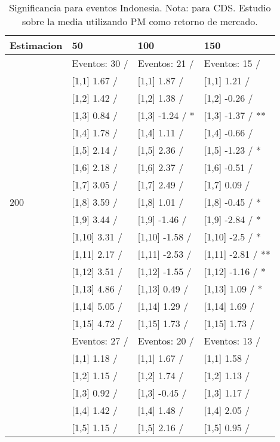 \begin{table}

\caption{Significancia para eventos Indonesia. Nota: para CDS. Estudio sobre la media utilizando PM como retorno de mercado.}
\centering
\begin{tabular}[t]{llll}
\toprule
Estimacion & 50 & 100 & 150\\
\midrule
 & Eventos:  30 / & Eventos:  21 / & Eventos:  15 /\\
 & {}[1,1] 1.67  / & {}[1,1] 1.87  / & {}[1,1] 1.21  /\\
 & {}[1,2] 1.42  / & {}[1,2] 1.38  / & {}[1,2] -0.26  /\\
 & {}[1,3] 0.84  / & {}[1,3] -1.24  / * & {}[1,3] -1.37  / **\\
 & {}[1,4] 1.78  / & {}[1,4] 1.11  / & {}[1,4] -0.66  /\\
\addlinespace
 & {}[1,5] 2.14  / & {}[1,5] 2.36  / & {}[1,5] -1.23  / *\\
 & {}[1,6] 2.18  / & {}[1,6] 2.37  / & {}[1,6] -0.51  /\\
 & {}[1,7] 3.05  / & {}[1,7] 2.49  / & {}[1,7] 0.09  /\\
200 & {}[1,8] 3.59  / & {}[1,8] 1.01  / & {}[1,8] -0.45  / *\\
 & {}[1,9] 3.44  / & {}[1,9] -1.46  / & {}[1,9] -2.84  / *\\
\addlinespace
 & {}[1,10] 3.31  / & {}[1,10] -1.58  / & {}[1,10] -2.5  / *\\
 & {}[1,11] 2.17  / & {}[1,11] -2.53  / & {}[1,11] -2.81  / **\\
 & {}[1,12] 3.51  / & {}[1,12] -1.55  / & {}[1,12] -1.16  / *\\
 & {}[1,13] 4.86  / & {}[1,13] 0.49  / & {}[1,13] 1.09  / *\\
 & {}[1,14] 5.05  / & {}[1,14] 1.29  / & {}[1,14] 1.69  /\\
\addlinespace
 & {}[1,15] 4.72  / & {}[1,15] 1.73  / & {}[1,15] 1.73  /\\
 & Eventos:  27 / & Eventos:  20 / & Eventos:  13 /\\
 & {}[1,1] 1.18  / & {}[1,1] 1.67  / & {}[1,1] 1.58  /\\
 & {}[1,2] 1.15  / & {}[1,2] 1.74  / & {}[1,2] 1.13  /\\
 & {}[1,3] 0.92  / & {}[1,3] -0.45  / & {}[1,3] 1.17  /\\
\addlinespace
 & {}[1,4] 1.42  / & {}[1,4] 1.48  / & {}[1,4] 2.05  /\\
 & {}[1,5] 1.15  / & {}[1,5] 2.16  / & {}[1,5] 0.95  /\\

\end{tabular}
\end{table}
